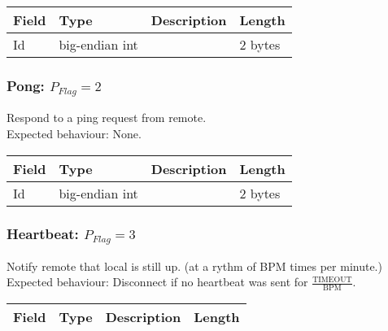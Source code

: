 \documentclass[a4paper,10pt]{article}
\begin{document}
                \noindent\begin{tabularx}{\textwidth}{|l|l|X|l|}
                    \hline Field & Type & Description & Length \\ \hline
                    \hline Id & big-endian int & & 2 bytes \\
                    \hline
                \end{tabularx}
            
            \subsubsection{Pong: $P_{Flag} = 2$}
                Respond to a ping request from remote.\\
                Expected behaviour: None.\\
                
                \noindent\begin{tabularx}{\textwidth}{|l|l|X|l|}
                    \hline Field & Type & Description & Length \\ \hline
                    \hline Id & big-endian int & & 2 bytes \\
                    \hline
                \end{tabularx}
            
            \subsubsection{Heartbeat: $P_{Flag} = 3$}
                Notify remote that local is still up. (at a rythm of BPM times per minute.)\\
                Expected behaviour: Disconnect if no heartbeat was sent for $\frac{\text{TIMEOUT}}{\text{BPM}}$.\\
                
                \noindent\begin{tabularx}{\textwidth}{|l|l|X|l|}
                    \hline Field & Type & Description & Length \\ \hline
                \end{tabularx}
            
\end{document}

